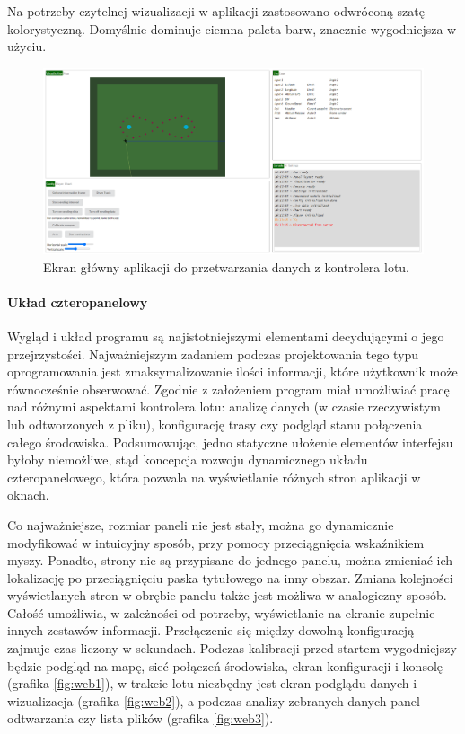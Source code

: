 \documentclass[12pt, a4paper]{article}
\begin{document}
Na potrzeby czytelnej wizualizacji w aplikacji zastosowano odwróconą szatę kolorystyczną. Domyślnie dominuje ciemna paleta barw, znacznie wygodniejsza w użyciu.

 \begin{figure}[ht]
    \centering
    \includegraphics[width=1\textwidth]{weball}
    \caption{Ekran główny aplikacji do przetwarzania danych z kontrolera lotu.}
    \label{fig:weball}
\end{figure}

\paragraph{Układ czteropanelowy}\mbox{}

Wygląd i układ programu są najistotniejszymi elementami decydującymi o jego przejrzystości. Najważniejszym zadaniem podczas projektowania tego typu oprogramowania jest zmaksymalizowanie ilości informacji, które użytkownik może równocześnie obserwować. Zgodnie z założeniem program  miał umożliwiać pracę nad różnymi aspektami kontrolera lotu: analizę danych (w czasie rzeczywistym lub odtworzonych z pliku), konfigurację trasy czy podgląd stanu połączenia całego środowiska. Podsumowując, jedno statyczne ułożenie elementów interfejsu byłoby niemożliwe, stąd koncepcja rozwoju dynamicznego układu czteropanelowego, która pozwala na wyświetlanie różnych stron aplikacji w oknach.

Co najważniejsze, rozmiar paneli nie jest stały, można go dynamicznie modyfikować w intuicyjny sposób, przy pomocy przeciągnięcia wskaźnikiem myszy. Ponadto, strony nie są przypisane do jednego panelu, można zmieniać ich lokalizację po przeciągnięciu paska tytułowego na inny obszar. Zmiana kolejności wyświetlanych stron w obrębie panelu także jest możliwa w analogiczny sposób. Całość umożliwia, w zależności od potrzeby, wyświetlanie na ekranie zupełnie innych zestawów informacji. Przełączenie się między dowolną konfiguracją zajmuje czas liczony w sekundach. Podczas kalibracji przed startem wygodniejszy będzie podgląd na mapę, sieć połączeń środowiska, ekran konfiguracji i konsolę (grafika \ref{fig:web1}), w trakcie lotu niezbędny jest ekran podglądu danych i wizualizacja (grafika \ref{fig:web2}), a podczas analizy zebranych danych panel odtwarzania czy lista plików (grafika \ref{fig:web3}).
\end{document}
